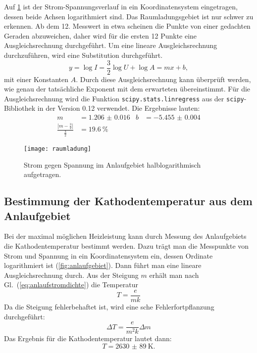 Auf \cref{fig:raumladung} ist der Strom-Spannungsverlauf in ein
Koordinatensystem eingetragen, dessen beide Achsen logarithmiert
sind. Das Raumladungsgebiet ist nur schwer zu erkennen. Ab dem
12. Messwert in etwa scheinen die Punkte von einer gedachten Geraden
abzuweichen, daher wird für die ersten 12 Punkte eine Ausgleichsrechnung
durchgeführt. Um eine lineare Ausgleichsrechnung durchzuführen, wird eine
Substitution durchgeführt.
%
\begin{equation*}
  y = \log I = \frac{3}{2} \log U + \log A = m x + b,
\end{equation*}
%
mit einer Konstanten $A$. Durch diese Ausgleichsrechnung kann überprüft
werden, wie genau der tatsächliche Exponent mit dem erwarteten
übereinstimmt. Für die Ausgleichsrechnung wird die Funktion
\texttt{scipy.stats.linregress} aus der \texttt{scipy}-Bibliothek in der
Version 0.12 verwendet. Die Ergebnisse lauten:
%
\begin{align*}
  m &= \num{1.206(16)} &
  b &= \num{-5.455(4)}\\
  \frac{|m - \frac{3}{2}|}{\frac{3}{2}} &= \SI{19.6}{\percent}
\end{align*}

\begin{figure}
  \centering
  \texttt{[image: raumladung]}
  \caption{Strom gegen Spannung im Anlaufgebiet halblogarithmisch
    aufgetragen.}
  \label{fig:raumladung}
\end{figure}

\subsection{Bestimmung der Kathodentemperatur aus dem Anlaufgebiet}

Bei der maximal möglichen Heizleistung kann durch Messung des
Anlaufgebiets die Kathodentemperatur bestimmt werden. Dazu trägt man die
Messpunkte von Strom und Spannung in ein Koordinatensystem ein, dessen
Ordinate logarithmiert ist (\cref{fig:anlaufgebiet}). Dann führt man
eine lineare Ausgleichsrechnung durch. Aus der Steigung $m$ erhält man
nach Gl.~(\eqref{eq:anlaufstromdichte}) die Temperatur
%
\begin{equation*}
  T = \frac{e}{m k}
\end{equation*}
Da die Steigung fehlerbehaftet ist, wird eine sche
Fehlerfortpflanzung durchgeführt:
%
\begin{equation*}
  \Delta T = \frac{e}{m^2k} \Delta m
\end{equation*}
%
Das Ergebnis für die Kathodentemperatur lautet dann:
%
\begin{equation*}
  T = \SI{2630(89)}{\kelvin}.
\end{equation*}

